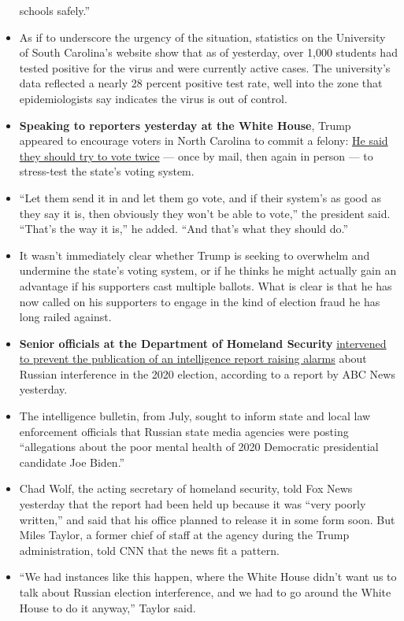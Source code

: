 \begin{itemize}
  schools safely.''
\item
  As if to underscore the urgency of the situation, statistics on the
  University of South Carolina's website show that as of yesterday, over
  1,000 students had tested positive for the virus and were currently
  active cases. The university's data reflected a nearly 28 percent
  positive test rate, well into the zone that epidemiologists say
  indicates the virus is out of control.
\item
  \textbf{Speaking to reporters yesterday at the White House}, Trump
  appeared to encourage voters in North Carolina to commit a felony:
  \href{https://www.nytimes3xbfgragh.onion/2020/09/02/us/politics/trump-people-vote-twice.html}{He
  said they should try to vote twice} --- once by mail, then again in
  person --- to stress-test the state's voting system.
\item
  ``Let them send it in and let them go vote, and if their system's as
  good as they say it is, then obviously they won't be able to vote,''
  the president said. ``That's the way it is,'' he added. ``And that's
  what they should do.''
\item
  It wasn't immediately clear whether Trump is seeking to overwhelm and
  undermine the state's voting system, or if he thinks he might actually
  gain an advantage if his supporters cast multiple ballots. What is
  clear is that he has now called on his supporters to engage in the
  kind of election fraud he has long railed against.
\item
  \textbf{Senior officials at the Department of Homeland Security}
  \href{https://www.nytimes3xbfgragh.onion/2020/09/02/us/politics/trump-biden-russia-election.html?action=click\&module=Top\%20Stories\&pgtype=Homepage}{intervened
  to prevent the publication of an intelligence report raising alarms}
  about Russian interference in the 2020 election, according to a report
  by ABC News yesterday.
\item
  The intelligence bulletin, from July, sought to inform state and local
  law enforcement officials that Russian state media agencies were
  posting ``allegations about the poor mental health of 2020 Democratic
  presidential candidate Joe Biden.''
\item
  Chad Wolf, the acting secretary of homeland security, told Fox News
  yesterday that the report had been held up because it was ``very
  poorly written,'' and said that his office planned to release it in
  some form soon. But Miles Taylor, a former chief of staff at the
  agency during the Trump administration, told CNN that the news fit a
  pattern.
\item
  ``We had instances like this happen, where the White House didn't want
  us to talk about Russian election interference, and we had to go
  around the White House to do it anyway,'' Taylor said.
\end{itemize}

